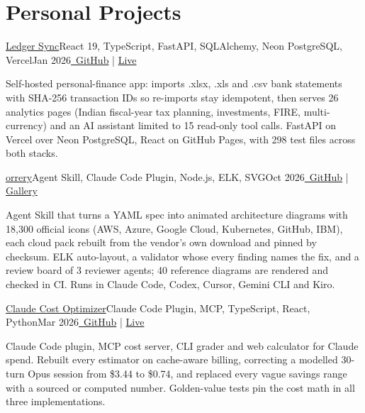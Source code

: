 \section{\textbf{Personal Projects}}
\vspace{-2pt}
\resumeSubHeadingListStart

\resumeExp
{\href{https://sagargupta.online/ledger-sync/}{Ledger Sync}}{React 19, TypeScript, FastAPI, SQLAlchemy, Neon PostgreSQL, Vercel}{Jan 2026}{\href{https://github.com/Sagargupta16/ledger-sync}{\faGithub\ GitHub} | \href{https://sagargupta.online/ledger-sync/}{Live}}
\resumeItemListStart
    \item[$\diamond$] Self-hosted personal-finance app: imports .xlsx, .xls and .csv bank statements with SHA-256 transaction IDs so re-imports stay idempotent, then serves 26 analytics pages (Indian fiscal-year tax planning, investments, FIRE, multi-currency) and an AI assistant limited to 15 read-only tool calls. FastAPI on Vercel over Neon PostgreSQL, React on GitHub Pages, with 298 test files across both stacks.
\resumeItemListEnd

\resumeExp
{\href{https://sagargupta.online/orrery/}{orrery}}{Agent Skill, Claude Code Plugin, Node.js, ELK, SVG}{Oct 2026}{\href{https://github.com/Sagargupta16/orrery}{\faGithub\ GitHub} | \href{https://sagargupta.online/orrery/gallery/}{Gallery}}
\resumeItemListStart
    \item[$\diamond$] Agent Skill that turns a YAML spec into animated architecture diagrams with 18,300 official icons (AWS, Azure, Google Cloud, Kubernetes, GitHub, IBM), each cloud pack rebuilt from the vendor's own download and pinned by checksum. ELK auto-layout, a validator whose every finding names the fix, and a review board of 3 reviewer agents; 40 reference diagrams are rendered and checked in CI. Runs in Claude Code, Codex, Cursor, Gemini CLI and Kiro.
\resumeItemListEnd

\resumeExp
{\href{https://sagargupta.online/claude-cost-optimizer/}{Claude Cost Optimizer}}{Claude Code Plugin, MCP, TypeScript, React, Python}{Mar 2026}{\href{https://github.com/Sagargupta16/claude-cost-optimizer}{\faGithub\ GitHub} | \href{https://sagargupta.online/claude-cost-optimizer/}{Live}}
\resumeItemListStart
    \item[$\diamond$] Claude Code plugin, MCP cost server, CLI grader and web calculator for Claude spend. Rebuilt every estimator on cache-aware billing, correcting a modelled 30-turn Opus session from \$3.44 to \$0.74, and replaced every vague savings range with a sourced or computed number. Golden-value tests pin the cost math in all three implementations.
\resumeItemListEnd

